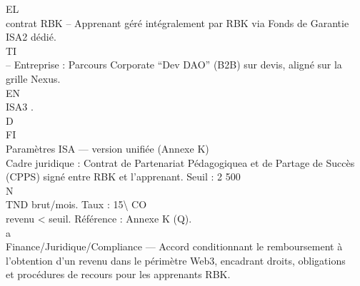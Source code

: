\vspace{0.5em}
\vspace{0.5em}
\vspace{0.5em}
\vspace{0.5em}
EL\\
contrat RBK – Apprenant géré intégralement par RBK via Fonds de Garantie ISA2 dédié.\\
\vspace{0.5em}
\vspace{0.5em}
\vspace{0.5em}
\vspace{0.5em}
TI\\
– Entreprise : Parcours Corporate “Dev DAO” (B2B) sur devis, aligné sur la grille Nexus.\\
\vspace{0.5em}
\vspace{0.5em}
\vspace{0.5em}
\vspace{0.5em}
EN\\
ISA3 .\\
\vspace{0.5em}
\vspace{0.5em}
\vspace{0.5em}
\vspace{0.5em}
D\\
FI\\
Paramètres ISA — version unifiée (Annexe K)\\
\vspace{0.5em}
Cadre juridique : Contrat de Partenariat Pédagogiquea et de Partage de Succès (CPPS) signé entre RBK et l’apprenant. Seuil : 2 500\\
N\\
TND brut/mois. Taux : 15\textbackslash{}%
CO\\
revenu \textless{} seuil. Référence : Annexe K (Q).\\
a\\
Finance/Juridique/Compliance — Accord conditionnant le remboursement à l’obtention d’un revenu dans le périmètre Web3, encadrant droits, obligations\\
et procédures de recours pour les apprenants RBK.\\
\vspace{0.5em}
\vspace{0.5em}
\vspace{0.5em}
\vspace{0.5em}
